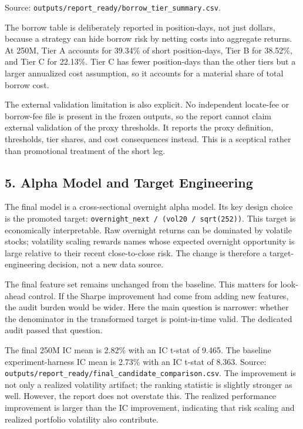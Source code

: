 \documentclass[
]{article}
\begin{document}
Source: \texttt{outputs/report\_ready/borrow\_tier\_summary.csv}.

The borrow table is deliberately reported in position-days, not just
dollars, because a strategy can hide borrow risk by netting costs into
aggregate returns. At 250M, Tier A accounts for 39.34\% of short
position-days, Tier B for 38.52\%, and Tier C for 22.13\%. Tier C has
fewer position-days than the other tiers but a larger annualized cost
assumption, so it accounts for a material share of total borrow cost.

The external validation limitation is also explicit. No independent
locate-fee or borrow-fee file is present in the frozen outputs, so the
report cannot claim external validation of the proxy thresholds. It
reports the proxy definition, thresholds, tier shares, and cost
consequences instead. This is a sceptical rather than promotional
treatment of the short leg.

\hypertarget{5-alpha-model-and-target-engineering}{%
\subsection{5. Alpha Model and Target
Engineering}\label{5-alpha-model-and-target-engineering}}

The final model is a cross-sectional overnight alpha model. Its key
design choice is the promoted target:
\texttt{overnight\_next\ /\ (vol20\ /\ sqrt(252))}. This target is
economically interpretable. Raw overnight returns can be dominated by
volatile stocks; volatility scaling rewards names whose expected
overnight opportunity is large relative to their recent close-to-close
risk. The change is therefore a target-engineering decision, not a new
data source.

The final feature set remains unchanged from the baseline. This matters
for look-ahead control. If the Sharpe improvement had come from adding
new features, the audit burden would be wider. Here the main question is
narrower: whether the denominator in the transformed target is
point-in-time valid. The dedicated audit passed that question.

The final 250M IC mean is 2.82\% with an IC t-stat of 9.465. The
baseline experiment-harness IC mean is 2.73\% with an IC t-stat of
8.363. Source:
\texttt{outputs/report\_ready/final\_candidate\_comparison.csv}. The
improvement is not only a realized volatility artifact; the ranking
statistic is slightly stronger as well. However, the report does not
overstate this. The realized performance improvement is larger than the
IC improvement, indicating that risk scaling and realized portfolio
volatility also contribute.
\end{document}
